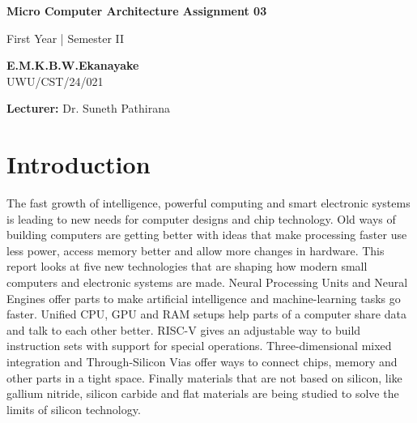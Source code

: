 \documentclass[a4paper,11pt]{article}
\begin{document}
\begin{titlepage}
    \centering
    \vspace*{3cm}
    {\LARGE \textbf{Micro Computer Architecture Assignment 03} \par}
    \vspace{1.5cm}

    {\large First Year | Semester II\par}
    \vfil

    {\large
    \textbf{E.M.K.B.W.Ekanayake}\\[0.3cm]
    UWU/CST/24/021
    \par}
    \vfil

    {\large
    \textbf{Lecturer:} Dr. Suneth Pathirana
    \par}

    \vspace*{2cm}

\end{titlepage}

\tableofcontents
\newpage
\section{Introduction}
The fast growth of intelligence, powerful computing and smart electronic systems is leading to new needs for 
computer designs and chip technology. Old ways of building computers are getting better with ideas that make 
processing faster use less power, access memory better and allow more changes in hardware. This report looks 
at five new technologies that are shaping how modern small computers and electronic systems are made. Neural 
Processing Units and Neural Engines offer parts to make artificial intelligence and machine-learning tasks go 
faster. Unified CPU, GPU and RAM setups help parts of a computer share data and talk to each other better. 
RISC-V gives an adjustable way to build instruction sets with support for special operations. 
Three-dimensional mixed integration and Through-Silicon Vias offer ways to connect chips, memory and 
other parts in a tight space. Finally materials that are not based on silicon, like gallium nitride,
 silicon carbide and flat materials are being studied to solve the limits of silicon technology.






\end{document}
